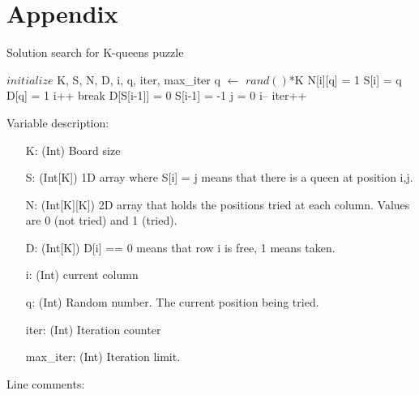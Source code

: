 \documentclass{article}
\begin{document}
\section{Appendix}
\begin{algorithm}[H]
\caption{Solution search for K-queens puzzle}
\label{alg:solvePuzzle}
\begin{algorithmic}[1]
    \State $initialize$ K, S, N, D, i, q, iter, max\_iter
        \State q $\gets$ $rand()$*K
            \State N[i][q] = 1 
                \State S[i] = q
                \State D[q] = 1
                \State i++
                    \State break
                \EndIf
            \EndIf
        \EndIf 
        \State D[S[i-1]] = 0
        \State S[i-1] = -1
            \State j = 0
        \EndFor     
        \State i--
    \EndIf
    \State iter++
    \EndWhile  
\end{algorithmic}
\end{algorithm}
Variable description:
\begin{enumerate}
    \item [K:] (Int) Board size
    \item [S:] (Int[K]) 1D array where S[i] = j means that there is a queen at position i,j. 
    \item [N:] (Int[K][K]) 2D array that holds the positions tried at each column. Values are 0 (not tried) and 1 (tried).
    \item [D:] (Int[K]) D[i] == 0 means that row i is free, 1 means taken.
    \item [i:] (Int) current column 
    \item [q:] (Int) Random number. The current position being tried.
    \item [iter:] (Int) Iteration counter
    \item [max\_iter:] (Int) Iteration limit.
\end{enumerate}
Line comments:
\end{document}
